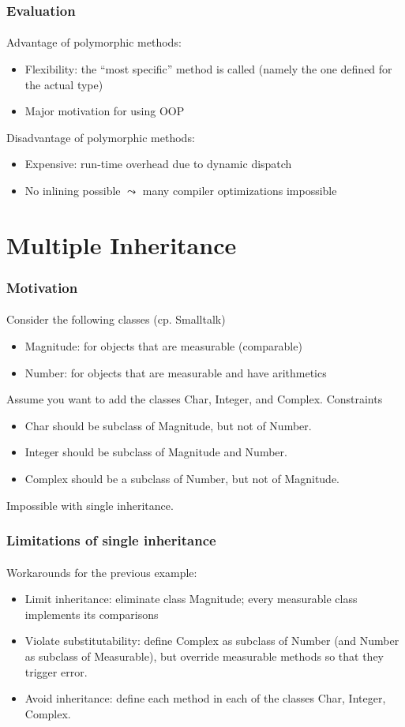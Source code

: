 \documentclass{beamer}
\begin{document}
\begin{frame}[fragile]
\frametitle{Evaluation}
\framesubtitle{}
Advantage of polymorphic methods: 
\begin{itemize}
\item Flexibility: the ``most specific'' method is called
(namely the one defined for the actual type)
\item Major motivation for using OOP
\end{itemize}
\bigskip

Disadvantage of polymorphic methods: 
\begin{itemize}
\item Expensive: run-time overhead due to dynamic dispatch
\item No inlining possible $\leadsto$ many compiler optimizations
impossible
\end{itemize}

\end{frame}





\section{Multiple Inheritance}

\begin{frame}[fragile]
\frametitle{Motivation}
\framesubtitle{}
Consider the following classes (cp. Smalltalk)
\begin{itemize}
\item Magnitude: for objects that are measurable (comparable)
\item Number: for objects that are measurable and have arithmetics
\end{itemize}
Assume you want to add the classes Char, Integer, and Complex.
Constraints
\begin{itemize}
\item Char should be subclass of Magnitude, but not of Number.
\item Integer should be subclass of Magnitude and Number.
\item Complex should be a subclass of Number, but not of Magnitude.
\end{itemize}
Impossible with single inheritance.
\end{frame}

\begin{frame}[fragile]
\frametitle{Limitations of single inheritance}
\framesubtitle{}
Workarounds for the previous example:

\begin{itemize}
\item Limit inheritance: eliminate class Magnitude; every measurable
class implements its comparisons
\item Violate substitutability: define Complex as subclass of Number
(and Number as subclass of Measurable), but override measurable
methods so that they trigger error.
\item Avoid inheritance: define each method in each of the classes
Char, Integer, Complex.
\end{itemize}
\end{frame}
\end{document}
